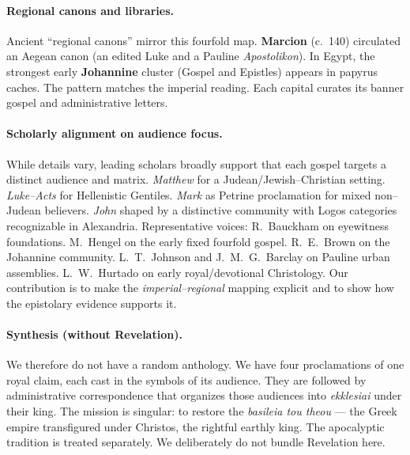\paragraph{Regional canons and libraries.}
Ancient “regional canons” mirror this fourfold map.
\textbf{Marcion} (c.~140) circulated an Aegean canon (an edited Luke and a Pauline \textit{Apostolikon}).
In Egypt, the strongest early \textbf{Johannine} cluster (Gospel and Epistles) appears in papyrus caches.
The pattern matches the imperial reading.
Each capital curates its banner gospel and administrative letters.

\paragraph{Scholarly alignment on audience focus.}
While details vary, leading scholars broadly support that each gospel targets a distinct audience and matrix.
\textit{Matthew} for a Judean/Jewish–Christian setting.
\textit{Luke–Acts} for Hellenistic Gentiles.
\textit{Mark} as Petrine proclamation for mixed non–Judean believers.
\textit{John} shaped by a distinctive community with Logos categories recognizable in Alexandria.
Representative voices: R.~Bauckham on eyewitness foundations.
M.~Hengel on the early fixed fourfold gospel.
R.~E.~Brown on the Johannine community.
L.~T.~Johnson and J.~M.~G.~Barclay on Pauline urban assemblies.
L.~W.~Hurtado on early royal/devotional Christology.
Our contribution is to make the \emph{imperial–regional} mapping explicit and to show how the epistolary evidence supports it.

\paragraph{Synthesis (without Revelation).}
We therefore do not have a random anthology.
We have four proclamations of one royal claim, each cast in the symbols of its audience.
They are followed by administrative correspondence that organizes those audiences into \textit{ekklesiai} under their king.
The mission is singular: to restore the \textit{basileia tou theou} — the Greek empire transfigured under Christos, the rightful earthly king.
The apocalyptic tradition is treated separately.
We deliberately do not bundle Revelation here.
